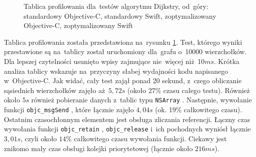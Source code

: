 \documentclass[mgr, shortabstract]{iithesis}
\newcommand{\objcinline}[1]{
    \texttt{#1}
}
\begin{document}
\begin{figure}
    \caption{Tablica profilowania dla~testów algorytmu Dijkstry, od~góry: standardowy Objective-C, standardowy Swift, zoptymalizowany Objective-C, zoptymalizowany Swift }
    \label{i:dijkstra}
\end{figure}

Tablica profilowania została przedstawiona na~rysunku \ref{i:dijkstra}. Test, którego wyniki przestawione są na~tablicy został uruchomiony dla~grafu o~10000 wierzchołków. Dla lepszej czytelności usunięto wpisy zajmujące nie~więcej niż 10$ms$. Krótka analiza tablicy wskazuje na~przyczyny słabej wydajności kodu napisanego w~Objective-C. Jak widać, cały test zajął ponad 20 sekund, z~czego obliczanie sąsiednich wierzchołków zajęło aż~$5,72s$ (około 27\% czasu całego testu). Również około $5s$ również pobieranie danych z~tablic typu \objcinline{NSArray}. Następnie, wywołanie funkcji \objcinline{objc_msgSend}, które łącznie zajęło $4,04s$ (ok. 19\% całkowitego czasu). Ostatnim czasochłonnym elementem jest obsługa zliczania referencji. Łączny czas wywołania funkcji \objcinline{objc_retain}, \objcinline{objc_release} i~ich pochodnych wyniósł łącznie $3,01s$, czyli około $14\%$ całkowitego czasu wywołania funkcji. Ciekawy jest znikomo mały czas obsługi kolejki priorytetowej (łącznie około $216ms$).
\end{document}
